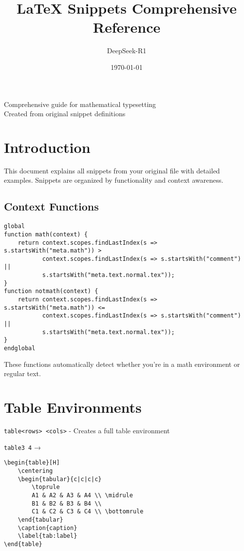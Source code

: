 \documentclass{article}
\title{\color{titlebg}\Huge\textbf{LaTeX Snippets Comprehensive Reference}}
\author{\Large DeepSeek-R1}
\date{\today}
\newcommand{\snippet}[1]{\textcolor{titlebg}{\texttt{#1}}}
\newcommand{\example}[1]{\colorbox{codebg}{\texttt{#1}}}
\begin{document}
\maketitle

\begin{center}
 Comprehensive guide for mathematical typesetting \\[5pt]
\small Created from original snippet definitions
\end{center}

\section{Introduction}
This document explains all snippets from your original file with detailed examples. Snippets are organized by functionality and context awareness.

\subsection{Context Functions}
\begin{tcolorbox}[colback=blue!5!white,colframe=blue!75!black,title=Context Detection]
\begin{verbatim}
global
function math(context) {
    return context.scopes.findLastIndex(s => s.startsWith("meta.math")) > 
           context.scopes.findLastIndex(s => s.startsWith("comment") || 
           s.startsWith("meta.text.normal.tex"));
}
function notmath(context) {
    return context.scopes.findLastIndex(s => s.startsWith("meta.math")) <= 
           context.scopes.findLastIndex(s => s.startsWith("comment") || 
           s.startsWith("meta.text.normal.tex"));
}
endglobal
\end{verbatim}
These functions automatically detect whether you're in a math environment or regular text.
\end{tcolorbox}

\section{Table Environments}

\begin{tcolorbox}[colback=green!5!white,colframe=green!75!black,title=Table Generator]
\snippet{table<rows> <cols>} - Creates a full table environment

\example{table3 4} → 
\begin{verbatim}
\begin{table}[H]
    \centering
    \begin{tabular}{c|c|c|c}
        \toprule
        A1 & A2 & A3 & A4 \\ \midrule
        B1 & B2 & B3 & B4 \\
        C1 & C2 & C3 & C4 \\ \bottomrule
    \end{tabular}
    \caption{caption}
    \label{tab:label}
\end{table}
\end{verbatim}
\end{tcolorbox}
\end{document}
